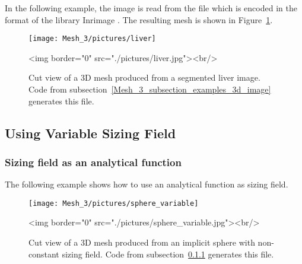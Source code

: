 In the following example, the image is read from the file
 which is encoded in the format of the library Inrimage
.
The resulting mesh is shown in Figure~\ref{figure:liver_3d_image_mesh}.


\begin{figure}[ht]
\begin{center}
 \begin{ccTexOnly}
   \texttt{[image: Mesh\_3/pictures/liver]}
 \end{ccTexOnly}
 \begin{ccHtmlOnly}
   <img border="0" src="./pictures/liver.jpg"><br/>
 \end{ccHtmlOnly}
 \caption{Cut view of a 3D mesh produced from a segmented liver image. Code from
 subsection~\ref{Mesh_3_subsection_examples_3d_image} generates this file.}
  \label{figure:liver_3d_image_mesh}
\end{center}
\end{figure}

\subsection{Using Variable Sizing Field}

\subsubsection{Sizing field as an analytical function}
\label{Mesh_3_subsubsection_examples_sphere_variable}

The following example shows how to use an analytical function as sizing field.


\begin{figure}[ht]
\begin{center}
 \begin{ccTexOnly}
   \texttt{[image: Mesh\_3/pictures/sphere\_variable]}
 \end{ccTexOnly}
 \begin{ccHtmlOnly}
   <img border="0" src="./pictures/sphere_variable.jpg"><br/>
 \end{ccHtmlOnly}
 \caption{Cut view of a 3D mesh produced from an implicit sphere with non-constant
 sizing field. Code from
 subsection~\ref{Mesh_3_subsubsection_examples_sphere_variable} generates this file.}
  \label{figure:sphere_variable_mesh}
\end{center}
\end{figure}

